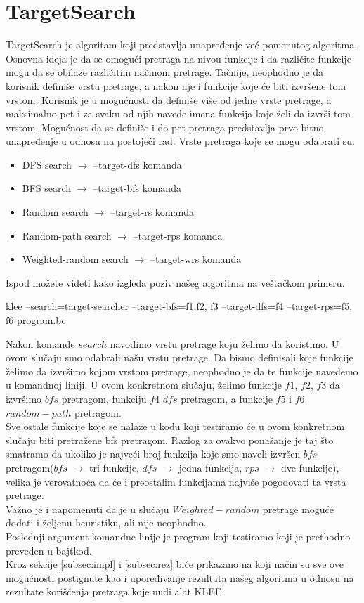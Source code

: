 \documentclass[a4paper]{article}
\begin{document}
\section{TargetSearch}\label{sec:Target}
TargetSearch je algoritam koji predstavlja unapređenje već pomenutog algoritma. Osnovna ideja je da se omogući pretraga na nivou funkcije i da različite funkcije mogu da se obilaze različitim načinom pretrage. Tačnije, neophodno je da korisnik definiše vrstu pretrage, a nakon nje i funkcije koje će biti izvršene tom vrstom. Korisnik je u mogućnosti da definiše više od jedne vrste pretrage, a maksimalno pet i za svaku od njih navede imena funkcija koje želi da izvrši tom vrstom. Mogućnost da se definiše i do pet pretraga predstavlja prvo bitno unapređenje u odnosu na postojeći rad. Vrste pretraga koje se mogu odabrati su:
\begin{itemize}
    \item DFS search $\rightarrow$ --target-dfs komanda
    \item BFS search $\rightarrow$ --target-bfs komanda
    \item Random search $\rightarrow$ --target-rs komanda
    \item Random-path search $\rightarrow$ --target-rps komanda
    \item Weighted-random search $\rightarrow$ --target-wrs komanda
\end{itemize}
Ispod možete videti kako izgleda poziv našeg algoritma na veštačkom primeru.
\begin{tcolorbox}[label={lst:targetSearch}, title={Primer korišćenja TargetSearch pretrage}]
klee --search=target-searcher --target-bfs=f1,f2, f3 --target-dfs=f4 --target-rps=f5, f6 program.bc
\end{tcolorbox}
Nakon komande ${search}$ navodimo vrstu pretrage koju želimo da koristimo. U ovom slučaju smo odabrali našu vrstu pretrage. Da bismo definisali koje funkcije želimo da izvršimo kojom vrstom pretrage, neophodno je da te funkcije navedemo u komandnoj liniji. U ovom konkretnom slučaju, želimo funkcije $f1$, $f2$, $f3$ da izvršimo $bfs$ pretragom, funkciju $f4$ $dfs$ pretragom, a funkcije $f5$ i $f6$ $random-path$ pretragom.\\
Sve ostale funkcije koje se nalaze u kodu koji testiramo će u ovom konkretnom slučaju biti pretražene bfs pretragom. Razlog za ovakvo ponašanje je taj što smatramo da ukoliko je najveći broj funkcija koje smo naveli izvršen $bfs$ pretragom($bfs$ $\rightarrow$ tri funkcije, $dfs$ $\rightarrow$ jedna funkcija, $rps$ $\rightarrow$ dve funkcije), velika je verovatnoća da će i preostalim funkcijama najviše pogodovati ta vrsta pretrage.\\
Važno je i napomenuti da je u slučaju ${Weighted-random}$ pretrage moguće dodati i željenu heuristiku, ali nije neophodno. \\
Poslednji argument komandne linije je program koji testiramo koji je prethodno preveden u bajtkod.\\
Kroz sekcije \ref{subsec:impl} i \ref{subsec:rez} biće prikazano na koji način su sve ove mogućnosti postignute kao i upoređivanje rezultata našeg algoritma u odnosu na rezultate korišćenja pretraga koje nudi alat KLEE.
\newpage
\end{document}
